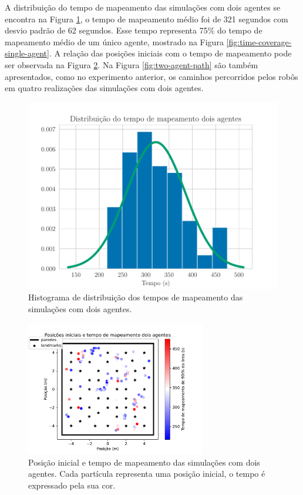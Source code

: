A distribuição do tempo de mapeamento das simulações com dois agentes se 
encontra na Figura \ref{fig:time-coverage-two-agents}, o tempo de 
mapeamento médio foi de 321 segundos com desvio padrão de 62 segundos. 
Esse tempo representa 75\% do tempo de mapeamento médio de um único 
agente, mostrado na Figura \ref{fig:time-coverage-single-agent}. A 
relação das posições iniciais com o tempo de mapeamento pode ser 
observada na Figura \ref{fig:two-agent-initial-pos-and-time}.  Na Figura \ref{fig:two-agent-path} são também apresentados, como no experimento anterior, 
os caminhos percorridos pelos robôs em quatro realizações das 
simulações com dois agentes.

\begin{figure}
  \centering
  \includegraphics[width=.7\textwidth]{figs/time-coverage_two_agents.pdf}
  \caption[Distribuição do tempo de mapeamento de dois agentes]{Histograma de distribuição dos tempos de mapeamento das simulações com dois agentes.}
  \label{fig:time-coverage-two-agents}
\end{figure}

\begin{figure}
  \centering
  \includegraphics[width=0.7\textwidth]{figs/two-agents/initial_positions_and_time_two_agents.pdf}
  \caption[Posição inicial e tempo de mapeamento das simulações com dois agentes.]{Posição inicial e tempo de mapeamento das simulações com dois agentes. Cada partícula representa uma posição inicial, o tempo é expressado pela sua cor.}
  \label{fig:two-agent-initial-pos-and-time}
\end{figure}


